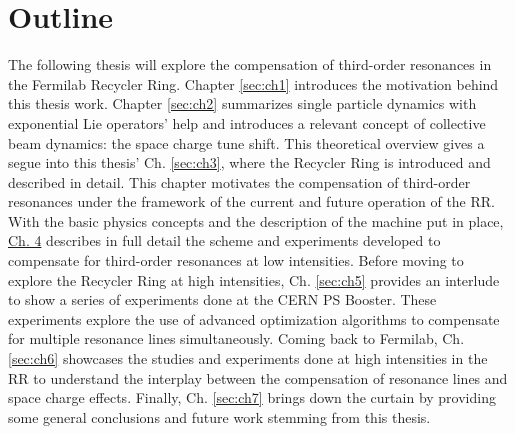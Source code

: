  \section{Outline}

The following thesis will explore the compensation of third-order resonances in the Fermilab Recycler Ring. Chapter \ref{sec:ch1} introduces the motivation behind this thesis work. Chapter \ref{sec:ch2} summarizes single particle dynamics with exponential Lie operators' help and introduces a relevant concept of collective beam dynamics: the space charge tune shift. This theoretical overview gives a segue into this thesis' Ch. \ref{sec:ch3}, where the Recycler Ring is introduced and described in detail. This chapter motivates the compensation of third-order resonances under the framework of the current and future operation of the RR. With the basic physics concepts and the description of the machine put in place, \hyperref[sec:ch4]{Ch. 4} describes in full detail the scheme and experiments developed to compensate for third-order resonances at low intensities. Before moving to explore the Recycler Ring at high intensities, Ch. \ref{sec:ch5} provides an interlude to show a series of experiments done at the CERN PS Booster. These experiments explore the use of advanced optimization algorithms to compensate for multiple resonance lines simultaneously. Coming back to Fermilab, Ch. \ref{sec:ch6} showcases the studies and experiments done at high intensities in the RR to understand the interplay between the compensation of resonance lines and space charge effects. Finally, Ch. \ref{sec:ch7} brings down the curtain by providing some general conclusions and future work stemming from this thesis.